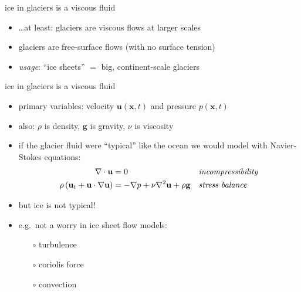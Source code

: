 \documentclass[hide notes,intlimits]{beamer}
\newcommand{\bx}{\mathbf{x}}
\begin{document}
\begin{frame}{ice in glaciers is a viscous fluid}
\bigskip\bigskip
\begin{itemize}
\item \dots at least: glaciers are viscous flows at larger scales
\item glaciers are free-surface flows (with no surface tension)
\item \emph{usage}: ``ice sheets'' $=$ big, continent-scale glaciers
\end{itemize}
\end{frame}


\begin{frame}{ice in glaciers is a viscous fluid}

\begin{itemize}
\item primary variables: velocity $\mathbf{u}(\bx,t)$ and pressure $p(\bx,t)$
\item also: $\rho$ is density, $\mathbf{g}$ is gravity, $\nu$ is viscosity
\item if the glacier fluid were ``typical'' like the ocean we would model with Navier-Stokes equations:
\begin{align*}
\nabla \cdot \mathbf{u} &= 0 &&\text{\emph{incompressibility}} \\
\rho \left(\mathbf{u}_t + \mathbf{u}\cdot\nabla \mathbf{u}\right) &= -\nabla p + \nu \nabla^2 \mathbf{u} + \rho \mathbf{g} &&\text{\emph{stress balance}}
\end{align*}
\item but ice is not typical!
\item e.g.~not a worry in ice sheet flow models:
  \begin{itemize}
  \item[$\circ$] turbulence
  \item[$\circ$] coriolis force
  \item[$\circ$] convection
  \end{itemize}
\end{itemize}
\end{frame}
\end{document}
